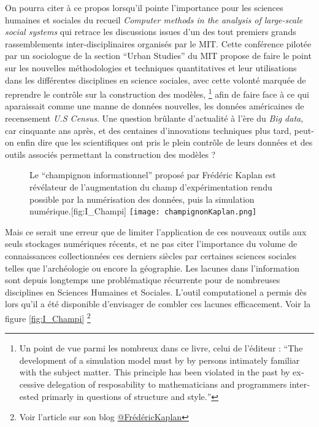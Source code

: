 On pourra citer à ce propos \textcite{Gullahorn1966} lorsqu'il pointe l'importance pour les sciences humaines et sociales du recueil \textit{Computer methods in the analysis of large-scale social systems} qui retrace les discussions issues d'un des tout premiers grands rassemblements inter-disciplinaires organisés par le MIT. Cette conférence pilotée par un sociologue de la section \foreignquote{english}{Urban Studies} du MIT \autocite{Beshers1965} propose de faire le point sur les nouvelles méthodologies et techniques quantitatives et leur utilisations dans les différentes disciplines en science sociales, avec cette volonté marquée de reprendre le contrôle sur la construction des modèles, \footnote{Un point de vue parmi les nombreux dans ce livre, celui de l'éditeur \textcite[194]{Beshers1965} : \foreignquote{english}{The development of a simulation model must by by persons intimately familiar with the subject matter. This principle has been violated in the past by excessive delegation of resposability to mathematicians and programmers interested primarly in questions of structure and style.} } afin de faire face à ce qui aparaissait comme une manne de données nouvelles, les données américaines de recensement \textit{U.S Census}. Une question brûlante d'actualité à l'ère du \textit{Big data}, car cinquante ans après, et des centaines d'innovations techniques plus tard, peut-on enfin dire que les scientifiques ont pris le plein contrôle de leurs données et des outils associés permettant la construction des modèles ?

\begin{figure}[!h]
\begin{sidecaption}[fortoc]{Le \enquote{champignon informationnel} proposé par Frédéric Kaplan est révélateur de l'augmentation du champ d'expérimentation rendu possible par la numérisation des données, puis la simulation numérique.}[fig:I_Champi]
 \centering
 \texttt{[image: champignonKaplan.png]}
  \end{sidecaption}
\end{figure}

Mais ce serait une erreur que de limiter l'application de ces nouveaux outils aux seuls stockages numériques récents, et ne pas citer l'importance du volume de connaissances collectionnées ces derniers siècles par certaines sciences sociales telles que l'archéologie ou encore la géographie. Les lacunes dans l'information sont depuis longtemps une problématique récurrente pour de nombreuses disciplines en Sciences Humaines et Sociales. L'outil computationel a permis dès lors qu'il a été disponible d'envisager de combler ces lacunes efficacement. Voir la figure \ref{fig:I_Champi} \footnote{Voir l'article sur son blog \href{http://fkaplan.wordpress.com/2013/03/14/lancement-de-la-venice-time-machine/}{@FrédéricKaplan}}

